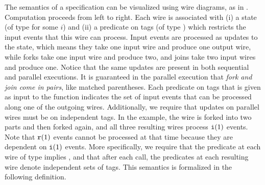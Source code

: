 The semantics of a specification
can be visualized using wire
diagrams, as in . Computation proceeds from left to right. Each wire is associated with
(i) a state (of type  for some $i$) and
(ii) a predicate on tags (of type )
which restricts the input events that this wire can process.
Input events are processed as
updates to the state, which means they take one input wire and produce
one output wire, while forks take one input wire and produce two, and
joins take two input wires and produce one. Notice that the same updates are present in both sequential and parallel executions. It is guaranteed in the
parallel execution that \emph{fork and join come in pairs}, like
matched parentheses. Each predicate on tags that is given as input to the  function indicates the set of input events that can be processed along one of the outgoing wires.
Additionally, we require that updates on parallel wires must be
on independent tags.
In the example,
the wire is forked into two parts and then forked again, and all three
resulting wires process $\texttt{i}(1)$ events. Note that $\texttt{r}(1)$
events cannot be processed at that time because they are dependent on
$\texttt{i}(1)$ events.
More specifically, we require that
the predicate at each wire of type 
implies , and that
after each  call,
the predicates at each resulting wire denote independent sets of tags.
This semantics is formalized in the following definition.

